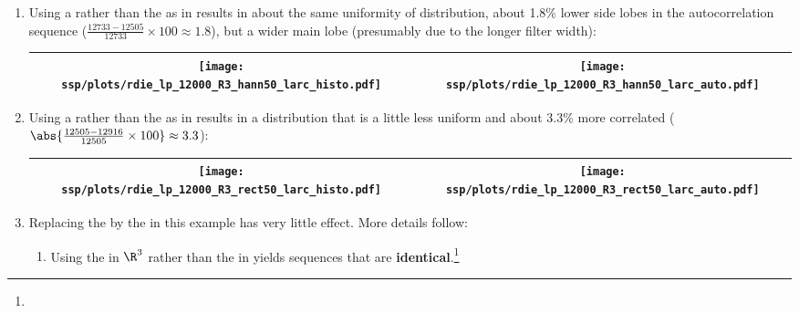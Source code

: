 \begin{example}
\begin{enumerate}
  \item \label{item:rdie_lp_R3_hann50_larc}
        Using a   rather than the 
         as in 
        results in about the same uniformity of distribution, about 1.8\% lower side lobes in the autocorrelation sequence
        ($\frac{12733-12505}{12733}\times100\approx1.8$),
        but a wider main lobe (presumably due to the longer filter width):
     \\\begin{tabular}{|>{\scs}c|>{\scs}c|}
          \hline
          \texttt{[image: ssp/plots/rdie\_lp\_12000\_R3\_hann50\_larc\_histo.pdf]}%
         &\texttt{[image: ssp/plots/rdie\_lp\_12000\_R3\_hann50\_larc\_auto.pdf]}
        \\\hline
     \end{tabular}

  \item \label{item:rdie_lp_R3_rect50_larc}
        Using a  rather than the 
         as in 
        results in a distribution that is a little less uniform and about 3.3\% more correlated
        ($\abs{\frac{12505-12916}{12505}\times100}\approx3.3$):
     \\\begin{tabular}{|>{\scs}c|>{\scs}c|}
          \hline
          \texttt{[image: ssp/plots/rdie\_lp\_12000\_R3\_rect50\_larc\_histo.pdf]}%
         &\texttt{[image: ssp/plots/rdie\_lp\_12000\_R3\_rect50\_larc\_auto.pdf]}
        \\\hline
     \end{tabular}

  \item \label{item:rdie_lp_R3_euclid}
        Replacing the  by the  in this example
        has very little effect.
        More details follow:
    \begin{enumerate}
      \item Using the  in $\R^3$ rather than the  in 
            yields sequences that are \textbf{identical}.\footnote{}


\end{enumerate}
\end{enumerate}
\end{example}
